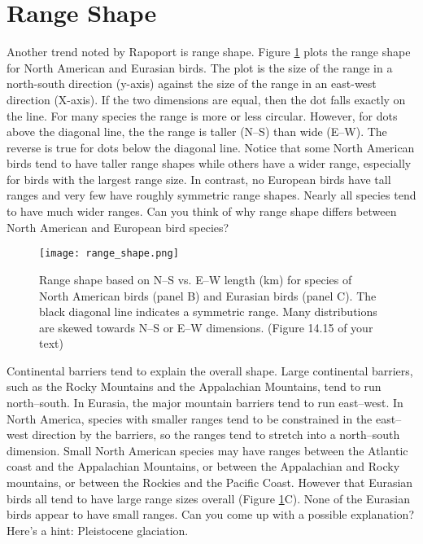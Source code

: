 \documentclass[11pt, hidelinks]{article}
\begin{document}
\section{Range Shape}

Another trend noted by Rapoport is range shape.  Figure \ref{range shape} plots the range shape for North American and Eurasian birds.  The plot is the size of the range in a north-south direction (y-axis) against the size of the range in an east-west direction (X-axis). If the two dimensions are equal, then the dot falls exactly on the line.  For many species the range is more or less circular.  However, for dots above the diagonal line, the the range is taller (N--S) than wide (E--W).  The reverse is true for dots below the diagonal line.  Notice that some North American birds tend to have taller range shapes while others have a wider range, especially for birds with the largest range size.  In contrast, no European birds have tall ranges and very few have roughly symmetric range shapes. Nearly all species tend to have much wider ranges.  Can you think of why range shape differs between North American and European bird species?

\begin{figure}
	\centering
		\texttt{[image: range\_shape.png]}  
		\caption{Range shape based on N--S vs. E--W length (km) for species of North American birds (panel B) and Eurasian birds (panel C). The black diagonal line indicates a symmetric range. Many distributions are skewed towards N--S or E--W dimensions. (Figure 14.15 of your text) \label{range shape}}
\end{figure}

Continental barriers tend to explain the overall shape.  Large continental barriers, such as the Rocky Mountains and the Appalachian Mountains, tend to run north--south.  In Eurasia, the major mountain barriers tend to run east--west. In North America, species with smaller ranges tend to be constrained in the east--west direction by the barriers, so the ranges tend to stretch into a north--south dimension.  Small North American species may have ranges between the Atlantic coast and the Appalachian Mountains, or between the Appalachian and Rocky mountains, or between the Rockies and the Pacific Coast.  However that Eurasian birds all tend to have large range sizes overall (Figure \ref{range shape}C).  None of the Eurasian birds appear to have small ranges. Can you come up with a possible explanation?  Here's a hint: Pleistocene glaciation.
\end{document}
